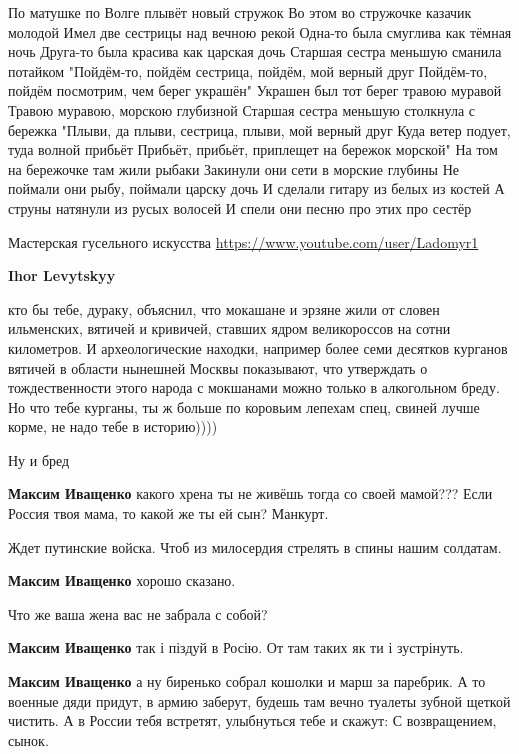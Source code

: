 \begin{itemize}
\begin{itemize}
\begin{multicols}{2}
\obeycr
По матушке по Волге плывёт новый стружок
Во этом во стружочке казачик молодой
Имел две сестрицы над вечною рекой
\smallskip
Одна-то была смуглива как тёмная ночь
Друга-то была красива как царская дочь
Старшая сестра меньшую сманила потайком
"Пойдём-то, пойдём сестрица, пойдём, мой верный друг
Пойдём-то, пойдём посмотрим, чем берег украшён"
\smallskip
Украшен был тот берег травою муравой
Травою муравою, морскою глубизной
Старшая сестра меньшую столкнула с бережка
"Плыви, да плыви, сестрица, плыви, мой верный друг
\smallskip
Куда ветер подует, туда волной прибьёт
Прибьёт, прибьёт, приплещет на бережок морской"
На том на бережочке там жили рыбаки
Закинули они сети в морские глубины
\smallskip
Не поймали они рыбу, поймали царску дочь
И сделали гитару из белых из костей
А струны натянули из русых волосей
И спели они песню про этих про сестёр
\restorecr

Мастерская гусельного искусства
\url{https://www.youtube.com/user/Ladomyr1}
\end{multicols} %

\textbf{Ihor Levytskyy} 

кто бы тебе, дураку, объяснил, что мокашане и эрзяне жили от словен ильменских,
вятичей и кривичей, ставших ядром великороссов на сотни километров. И
археологические находки, например более семи десятков курганов вятичей в
области нынешней Москвы показывают, что утверждать о тождественности этого
народа с мокшанами можно только в алкогольном бреду. Но что тебе курганы, ты ж
больше по коровьим лепехам спец, свиней лучше корме, не надо тебе в историю))))

\end{itemize} %

Ну и бред

\begin{itemize} %
\textbf{Максим Иващенко} какого хрена ты не живёшь тогда со своей мамой??? Если Россия твоя мама, то какой же ты ей сын? Манкурт.

Ждет путинские войска.
Чтоб из милосердия стрелять в спины нашим солдатам.


\textbf{Максим Иващенко} хорошо сказано.

Что же ваша жена вас не забрала с собой?

\textbf{Максим Иващенко} так і піздуй в Росію. От там таких як ти і зустрінуть.

\textbf{Максим Иващенко} а ну биренько собрал кошолки и марш за паребрик. А то военные дяди придут, в армию заберут, будешь там вечно туалеты зубной щеткой чистить. А в России тебя встретят, улыбнуться тебе и скажут: С возвращением, сынок.


\end{itemize}
\end{itemize}
